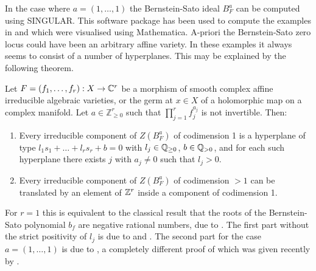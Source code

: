     In the case where $a =(1,\ldots,1)$ the Bernstein-Sato ideal $B_F^a$ can be computed using SINGULAR.
    This software package has been used to compute the examples in  and  which were visualised using Mathematica.
    A-priori the Bernstein-Sato zero locus could have been an arbitrary affine variety.
    In these examples it always seems to consist of a number of hyperplanes.
    This may be explained by the following theorem.
    \begin{theorem}{\cite[Theorem 1.1.1]{budur2020zeroII}} \label{thrmMoreA}
      Let $F=(f_1,\ldots,f_r):X\rightarrow\mathbb{C}^r$ be a morphism of smooth complex affine irreducible algebraic varieties, or the germ at $x\in X$ of a holomorphic map on a complex manifold.  Let $a\in\mathbb{Z}_{\geq 0}^r$ such that $\prod_{j=1}^rf_j^{a_j}$ is not invertible. Then:
    \begin{enumerate}
    \item Every irreducible component of $Z(B_F^{a})$ of codimension 1 is a  hyperplane of type $l_1s_1+\ldots+l_rs_r+b=0$ with $l_j\in\mathbb{Q}_{\ge 0}$, $b\in\mathbb{Q}_{>0}$, and for each such hyperplane there exists $j$ with $a_j\ne 0$ such that $l_j>0$.
    \item Every irreducible component of  $Z(B_F^{a})$ of codimension $>1$  can be translated by an element of $\mathbb{Z}^r$ inside a component of codimension 1.
    \end{enumerate}
    \end{theorem}
    For $r=1$ this is equivalent to the classical result that the roots of the Bernstein-Sato polynomial $b_f$ are negative rational numbers, due to \cite{kashiwara1976b}.
    The first part without the strict positivity of $l_j$ is due to \cite{sabbah1987proximite} and  \cite{gyoja1993bernstein}.
    The second part for the case $a=(1,\ldots,1)$ is due to \cite{maisonobe2016filtration}, a completely different proof of which was given recently by \cite{robin}.
